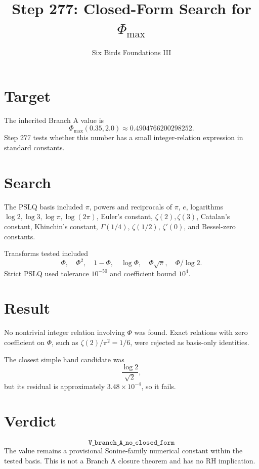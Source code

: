 \documentclass[11pt]{article}
\title{Step 277: Closed-Form Search for \(\Phi_{\max}\)}
\author{Six Birds Foundations III}
\date{}
\begin{document}
\maketitle

\section*{Target}
The inherited Branch A value is
\[
\Phi_{\max}(0.35,2.0)\approx 0.4904766200298252.
\]
Step 277 tests whether this number has a small integer-relation expression in
standard constants.

\section*{Search}
The PSLQ basis included \(\pi\), powers and reciprocals of \(\pi\), \(e\),
logarithms \(\log 2,\log 3,\log\pi,\log(2\pi)\), Euler's constant,
\(\zeta(2),\zeta(3)\), Catalan's constant, Khinchin's constant,
\(\Gamma(1/4)\), \(\zeta(1/2)\), \(\zeta'(0)\), and Bessel-zero constants.

Transforms tested included
\[
\Phi,\quad \Phi^2,\quad 1-\Phi,\quad \log\Phi,\quad
\Phi\sqrt\pi,\quad \Phi/\log 2.
\]
Strict PSLQ used tolerance \(10^{-50}\) and coefficient bound \(10^4\).

\section*{Result}
No nontrivial integer relation involving \(\Phi\) was found.  Exact relations
with zero coefficient on \(\Phi\), such as \(\zeta(2)/\pi^2=1/6\), were rejected
as basis-only identities.

The closest simple hand candidate was
\[
\frac{\log 2}{\sqrt2},
\]
but its residual is approximately \(3.48\times10^{-4}\), so it fails.

\section*{Verdict}
\[
\boxed{\texttt{V\_branch\_A\_no\_closed\_form}}
\]
The value remains a provisional Sonine-family numerical constant within the
tested basis.  This is not a Branch A closure theorem and has no RH implication.
\end{document}
